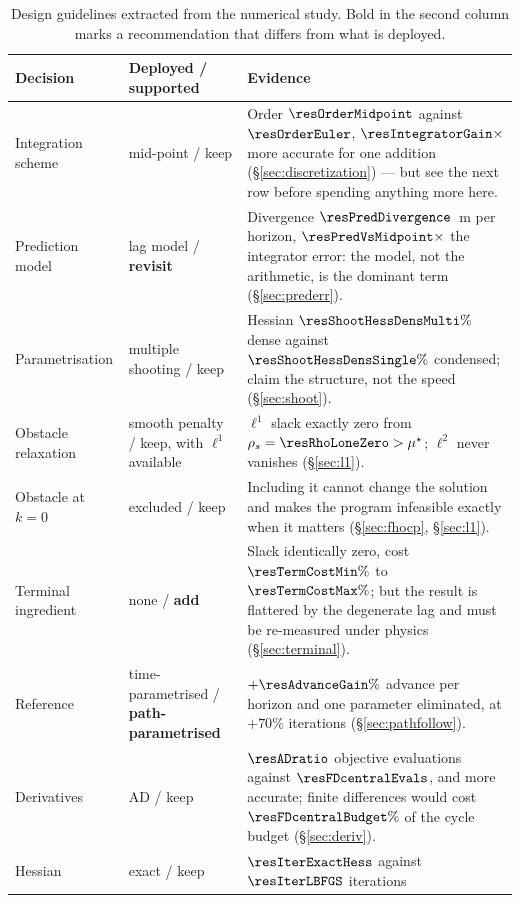\documentclass[11pt,a4paper]{article}
\begin{document}
\begin{table}[htbp]
  \centering
  \small
  \caption{Design guidelines extracted from the numerical study. Bold in the second column marks a
  recommendation that differs from what is deployed.}
  \label{tab:guidelines}
  \begin{tabular}{p{}p{}p{}}
    \toprule
    Decision & Deployed / supported & Evidence \\
    \midrule
    Integration scheme & mid-point / keep & Order $\resOrderMidpoint$ against $\resOrderEuler$,
      $\resIntegratorGain\times$ more accurate for one addition (\S\ref{sec:discretization}) --- but see the
      next row before spending anything more here. \\
    Prediction model & lag model / \textbf{revisit} & Divergence $\resPredDivergence$~m per horizon,
      $\resPredVsMidpoint\times$ the integrator error: the model, not the arithmetic, is the dominant term
      (\S\ref{sec:prederr}). \\
    Parametrisation & multiple shooting / keep & Hessian $\resShootHessDensMulti\%$ dense against
      $\resShootHessDensSingle\%$ condensed; claim the structure, not the speed (\S\ref{sec:shoot}). \\
    Obstacle relaxation & smooth penalty / keep, with $\ell^1$ available & $\ell^1$ slack exactly zero from
      $\rho_s=\resRhoLoneZero>\mu^\star$; $\ell^2$ never vanishes (\S\ref{sec:l1}). \\
    Obstacle at $k=0$ & excluded / keep & Including it cannot change the solution and makes the program
      infeasible exactly when it matters (\S\ref{sec:fhocp}, \S\ref{sec:l1}). \\
    Terminal ingredient & none / \textbf{add} & Slack identically zero, cost $\resTermCostMin\%$ to
      $\resTermCostMax\%$; but the result is flattered by the degenerate lag and must be re-measured under
      physics (\S\ref{sec:terminal}). \\
    Reference & time-parametrised / \textbf{path-parametrised} & $+\resAdvanceGain\%$ advance per horizon and
      one parameter eliminated, at $+70\%$ iterations (\S\ref{sec:pathfollow}). \\
    Derivatives & AD / keep & $\resADratio$ objective evaluations against $\resFDcentralEvals$, and more
      accurate; finite differences would cost $\resFDcentralBudget\%$ of the cycle budget
      (\S\ref{sec:deriv}). \\
    Hessian & exact / keep & $\resIterExactHess$ against $\resIterLBFGS$ iterations

\end{tabular}
\end{table}
\end{document}
